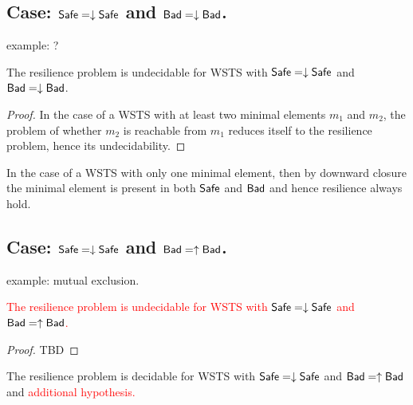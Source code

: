 

\subsection{Case: $\textsf{Safe}=\downarrow \textsf{Safe}$ and $\textsf{Bad}=\downarrow \textsf{Bad}$.}

example: ?


\begin{theorem}\label{down-down}
The resilience problem is undecidable for WSTS with
$\textsf{Safe}=\downarrow \textsf{Safe}$
and $\textsf{Bad}=\downarrow \textsf{Bad}$.
\end{theorem}

\begin{proof}
In the case of a WSTS with at least two minimal elements $m_1$ and $m_2$, the problem of whether $m_2$ is reachable from $m_1$ reduces itself to the resilience problem, hence its undecidability.  
\end{proof}

In the case of a WSTS with only one minimal element,  
then by downward closure the minimal element is present in both $\textsf{Safe}$ and $\textsf{Bad}$ and hence resilience always hold.






\subsection{Case: $\textsf{Safe}=\downarrow \textsf{Safe}$ and $\textsf{Bad}=\uparrow \textsf{Bad}$.}
%
%
example: mutual exclusion.

\begin{theorem}\label{up-down}
\textcolor{red}{
The resilience problem is undecidable for WSTS with 
$\textsf{Safe}=\downarrow \textsf{Safe}$
and $\textsf{Bad}=\uparrow \textsf{Bad}$.
}
\end{theorem}

\begin{proof}
TBD
\end{proof}



\begin{theorem}
The resilience problem is decidable for WSTS with 
$\textsf{Safe}=\downarrow \textsf{Safe}$
and $\textsf{Bad}=\uparrow \textsf{Bad}$
and
\textcolor{red}{
additional hypothesis.
}
\end{theorem}


